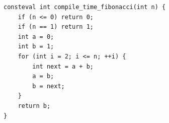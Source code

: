 \begin{verbatim}
consteval int compile_time_fibonacci(int n) {
    if (n <= 0) return 0;
    if (n == 1) return 1;
    int a = 0;
    int b = 1;
    for (int i = 2; i <= n; ++i) {
        int next = a + b;
        a = b;
        b = next;
    }
    return b;
}
\end{verbatim}
